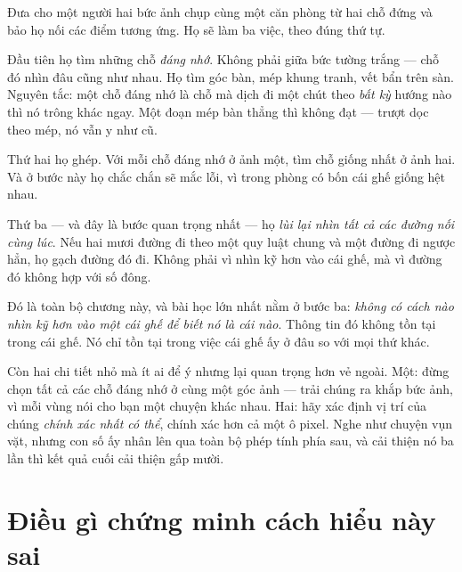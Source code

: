 \documentclass[../../vslam.tex]{subfiles}
\begin{document}
\begin{dongian}
Đưa cho một người hai bức ảnh chụp cùng một căn phòng từ hai chỗ đứng và bảo họ nối các điểm tương ứng. Họ sẽ làm ba việc, theo đúng thứ tự.

Đầu tiên họ tìm những chỗ \emph{đáng nhớ}. Không phải giữa bức tường trắng --- chỗ đó nhìn đâu cũng như nhau. Họ tìm góc bàn, mép khung tranh, vết bẩn trên sàn. Nguyên tắc: một chỗ đáng nhớ là chỗ mà dịch đi một chút theo \emph{bất kỳ} hướng nào thì nó trông khác ngay. Một đoạn mép bàn thẳng thì không đạt --- trượt dọc theo mép, nó vẫn y như cũ.

Thứ hai họ ghép. Với mỗi chỗ đáng nhớ ở ảnh một, tìm chỗ giống nhất ở ảnh hai. Và ở bước này họ chắc chắn sẽ mắc lỗi, vì trong phòng có bốn cái ghế giống hệt nhau.

Thứ ba --- và đây là bước quan trọng nhất --- họ \emph{lùi lại nhìn tất cả các đường nối cùng lúc}. Nếu hai mươi đường đi theo một quy luật chung và một đường đi ngược hẳn, họ gạch đường đó đi. Không phải vì nhìn kỹ hơn vào cái ghế, mà vì đường đó không hợp với số đông.

Đó là toàn bộ chương này, và bài học lớn nhất nằm ở bước ba: \emph{không có cách nào nhìn kỹ hơn vào một cái ghế để biết nó là cái nào}. Thông tin đó không tồn tại trong cái ghế. Nó chỉ tồn tại trong việc cái ghế ấy ở đâu so với mọi thứ khác.

Còn hai chi tiết nhỏ mà ít ai để ý nhưng lại quan trọng hơn vẻ ngoài. Một: đừng chọn tất cả các chỗ đáng nhớ ở cùng một góc ảnh --- trải chúng ra khắp bức ảnh, vì mỗi vùng nói cho bạn một chuyện khác nhau. Hai: hãy xác định vị trí của chúng \emph{chính xác nhất có thể}, chính xác hơn cả một ô pixel. Nghe như chuyện vụn vặt, nhưng con số ấy nhân lên qua toàn bộ phép tính phía sau, và cải thiện nó ba lần thì kết quả cuối cải thiện gấp mười.

\end{dongian}

\section{Điều gì chứng minh cách hiểu này sai}
\end{document}
